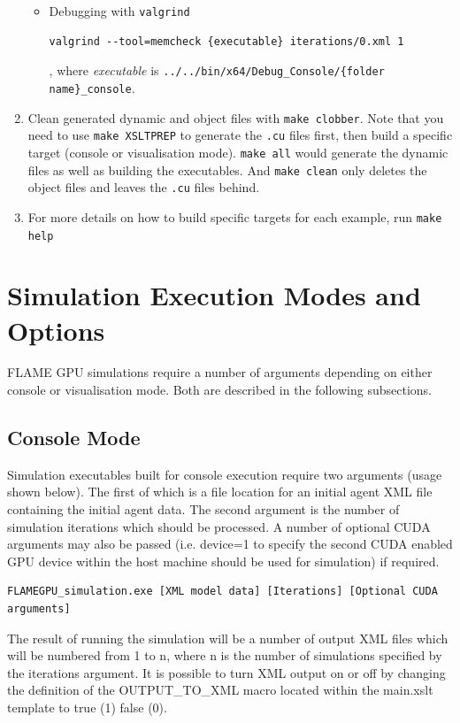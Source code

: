 \documentclass[11pt, a4paper, onecolumn, oneside]{report}
\begin{document}
\begin{enumerate}
\begin{itemize}
\item Debugging with \verb|valgrind|
\begin{verbatim}
valgrind --tool=memcheck {executable} iterations/0.xml 1
\end{verbatim}
, where \textit{{executable}} is \verb|../../bin/x64/Debug_Console/{folder name}_console|.
\end{itemize}

\item Clean generated dynamic and object files with \verb|make clobber|. Note that you need to use \verb|make XSLTPREP| to generate the \verb|.cu| files first, then build a specific target (console or visualisation mode). \verb|make all| would generate the dynamic files as well as building the executables. And \verb|make clean| only deletes the object files and leaves the \verb|.cu| files behind.

\item For more details on how to build specific targets for each example, run
\verb|make help|
\end{enumerate}


\section{Simulation Execution Modes and Options}
\label{sec:45}


FLAME GPU simulations require a number of arguments depending on either console or visualisation mode. Both are described in the following subsections.


\subsection{Console Mode}
\label{sec:451}


Simulation executables built for console execution require two arguments (usage shown below).
The first of which is a file location for an initial agent XML file containing the initial agent data.
The second argument is the number of simulation iterations which should be processed.
A number of optional CUDA arguments may also be passed (i.e.
device=1 to specify the second CUDA enabled GPU device within the host machine should be used for simulation) if required.

\begin{verbatim}
FLAMEGPU_simulation.exe [XML model data] [Iterations] [Optional CUDA arguments]
\end{verbatim}

The result of running the simulation will be a number of output XML files which will be numbered from 1 to n, where n is the number of simulations specified by the iterations argument.
It is possible to turn XML output on or off by changing the definition of the OUTPUT\_TO\_XML macro located within the main.xslt template to true (1) false (0).
\end{document}
